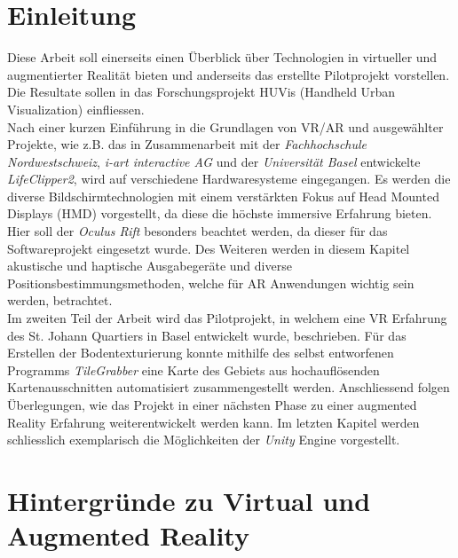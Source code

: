 \chapter{Einleitung}
\vspace{-20pt}
Diese Arbeit soll einerseits einen Überblick über Technologien in virtueller und augmentierter Realität bieten und anderseits das erstellte Pilotprojekt vorstellen. Die Resultate sollen in das Forschungsprojekt HUVis (Handheld Urban Visualization) einfliessen.\\[6pt]
Nach einer kurzen Einführung in die Grundlagen von VR/AR und ausgewählter Projekte, wie z.B. das in Zusammenarbeit mit der \textit{Fachhochschule Nordwestschweiz}, \textit{i-art interactive AG} und der \textit{Universität Basel} entwickelte \textit{LifeClipper2}, wird auf verschiedene Hardwaresysteme eingegangen. Es werden die diverse Bildschirmtechnologien mit einem verstärkten Fokus auf Head Mounted Displays (HMD) vorgestellt, da diese die höchste immersive Erfahrung bieten. Hier soll der \textit{Oculus Rift} besonders beachtet werden, da dieser für das Softwareprojekt eingesetzt wurde. Des Weiteren werden in diesem Kapitel akustische und haptische Ausgabegeräte und diverse Positionsbestimmungsmethoden, welche für AR Anwendungen wichtig sein werden, betrachtet.\\[6pt]
Im zweiten Teil der Arbeit wird das Pilotprojekt, in welchem eine VR Erfahrung des St. Johann Quartiers in Basel entwickelt wurde, beschrieben. Für das Erstellen der Bodentexturierung konnte mithilfe des selbst entworfenen Programms \textit{TileGrabber} eine Karte des Gebiets aus hochauflösenden Kartenausschnitten automatisiert zusammengestellt werden. Anschliessend folgen Überlegungen, wie das Projekt in einer nächsten Phase zu einer augmented Reality Erfahrung weiterentwickelt werden kann. Im letzten Kapitel werden schliesslich exemplarisch die Möglichkeiten der \textit{Unity} Engine vorgestellt.

\chapter{Hintergründe zu Virtual und Augmented Reality}\label{c.wasist}
\vspace{-20pt}
